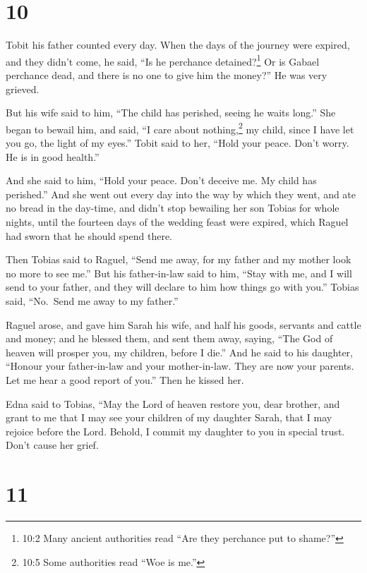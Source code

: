 \hypertarget{section-9}{%
\section{10}\label{section-9}}

 Tobit his father counted every day. When the days of the
journey were expired, and they didn't come,  he said, ``Is
he perchance detained?\footnote{10:2 Many ancient authorities read ``Are
  they perchance put to shame?''} Or is Gabael perchance dead, and there
is no one to give him the money?''  He was very grieved.

 But his wife said to him, ``The child has perished, seeing
he waits long.'' She began to bewail him, and said,  ``I
care about nothing,\footnote{10:5 Some authorities read ``Woe is me.''}
my child, since I have let you go, the light of my eyes.'' 
Tobit said to her, ``Hold your peace. Don't worry. He is in good
health.''

 And she said to him, ``Hold your peace. Don't deceive me.
My child has perished.'' And she went out every day into the way by
which they went, and ate no bread in the day-time, and didn't stop
bewailing her son Tobias for whole nights, until the fourteen days of
the wedding feast were expired, which Raguel had sworn that he should
spend there.

Then Tobias said to Raguel, ``Send me away, for my father and my mother
look no more to see me.''  But his father-in-law said to
him, ``Stay with me, and I will send to your father, and they will
declare to him how things go with you.''  Tobias said,
``No.~Send me away to my father.''

 Raguel arose, and gave him Sarah his wife, and half his
goods, servants and cattle and money;  and he blessed them,
and sent them away, saying, ``The God of heaven will prosper you, my
children, before I die.''  And he said to his daughter,
``Honour your father-in-law and your mother-in-law. They are now your
parents. Let me hear a good report of you.'' Then he kissed her.

Edna said to Tobias, ``May the Lord of heaven restore you, dear brother,
and grant to me that I may see your children of my daughter Sarah, that
I may rejoice before the Lord. Behold, I commit my daughter to you in
special trust. Don't cause her grief.

\hypertarget{section-10}{%
\section{11}\label{section-10}}


